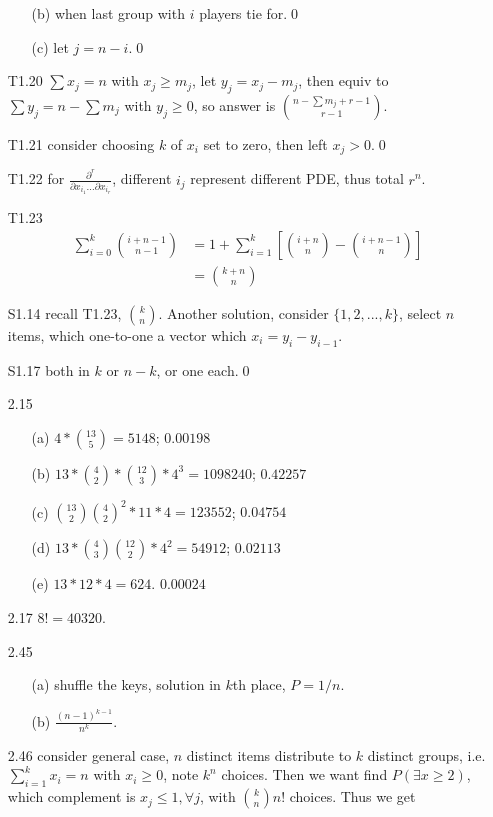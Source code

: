 \documentclass[paper=a4, fontsize=11pt]{scrartcl} %
\numberwithin{equation}{section} %
\numberwithin{figure}{section} %
\numberwithin{table}{section} %
\begin{document}
\begin{itemize}
	\begin{itemize}
		\item[(b)] when last group with $i$ players tie for.\qed
		\item[(c)] let $j=n-i$.\qed
	\end{itemize}
	\item[T1.20] $\sum x_j=n$ with $x_j\geq m_j$, let $y_j = x_j-m_j$, then equiv to $\sum y_j = n-\sum m_j$ with $y_j\geq 0$, so answer is ${n-\sum m_j + r -1 \choose r-1}$.
	\item[T1.21] consider choosing $k$ of $x_i$ set to zero, then left $x_j>0$.\qed 
	\item[T1.22] for $\frac{\partial^r}{\partial x_{i_1}\dots \partial x_{i_r}}$, different $i_j$ represent different PDE, thus total $r^n$.
	\item[T1.23]
	\begin{align}
		\sum_{i=0}^k {i+n-1 \choose n-1} &= 1+\sum_{i=1}^k \left[{i+n \choose n} - {i+n-1 \choose n}\right]\\
		&= {k+n \choose n}
	\end{align}
	\item[S1.14] recall T1.23, ${k\choose n}$. Another solution, consider $\{1,2,...,k\}$, select $n$ items, which one-to-one a vector which $x_i = y_i-y_{i-1}$.
	\item[S1.17] both in $k$ or $n-k$, or one each.\qed
	\item[2.15]
	\begin{itemize}
		\item[(a)] $4*{13 \choose 5} =  5148$; $0.00198$
		\item[(b)] $13*{4\choose 2}*{12\choose 3}*4^3 = 1098240$; $0.42257$
		\item[(c)] ${13\choose 2}{4\choose 2}^2*11*4 = 123552$; $0.04754$
		\item[(d)] $13*{4\choose 3}{12\choose 2}*4^2 = 54912$; $0.02113$
		\item[(e)] $13*12*4=624$. $0.00024$
	\end{itemize}
	\item[2.17] $8!=40320$.
	\item[2.45] 
	\begin{itemize}
		\item[(a)] shuffle the keys, solution in $k$th place, $P=1/n$.
		\item[(b)] $\frac{(n-1)^{k-1}}{n^k}$.
	\end{itemize}
	\item[2.46] consider general case, $n$ distinct items distribute to $k$ distinct groups, i.e. $\sum_{i=1}^k x_i= n$ with $x_i\geq 0$, note $k^n$ choices. Then we want find $P(\exists x\geq 2)$, which complement is $x_j\leq 1,\forall j$, with ${k \choose n} n!$ choices. Thus we get

\end{itemize}
\end{document}

